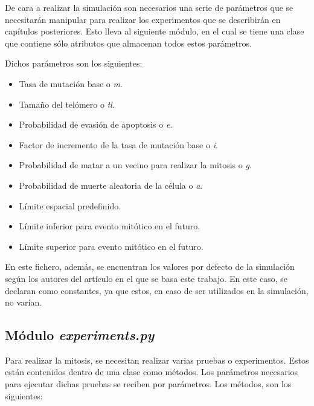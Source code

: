 De cara a realizar la simulación son necesarios una serie de parámetros que se necesitarán manipular
para realizar los experimentos que se describirán en capítulos posteriores. Esto lleva al siguiente módulo,
en el cual se tiene una clase que contiene sólo atributos que almacenan todos estos parámetros.

Dichos parámetros son los siguientes:

\begin{itemize}
    \item Tasa de mutación base o \textit{m}.
    \item Tamaño del telómero o \textit{tl}.
    \item Probabilidad de evasión de apoptosis o \textit{e}.
    \item Factor de incremento de la tasa de mutación base o \textit{i}.
    \item Probabilidad de matar a un vecino para realizar la mitosis o \textit{g}.
    \item Probabilidad de muerte aleatoria de la célula o \textit{a}.
    \item Límite espacial predefinido.
    \item Límite inferior para evento mitótico en el futuro.
    \item Límite superior para evento mitótico en el futuro.
\end{itemize}

En este fichero, además, se encuentran los valores por defecto de la simulación según los autores
del artículo \cite{jsantos-amonteagudo-1-2014} en el que se basa este trabajo. En este caso,
se declaran como constantes, ya que estos, en caso de ser utilizados en la simulación, no varían.

\subsection{Módulo \textit{experiments.py}}

Para realizar la mitosis, se necesitan realizar varias pruebas o experimentos. Estos
están contenidos dentro de una clase como métodos. Los parámetros necesarios para ejecutar dichas
pruebas se reciben por parámetros. Los métodos, son los siguientes:


